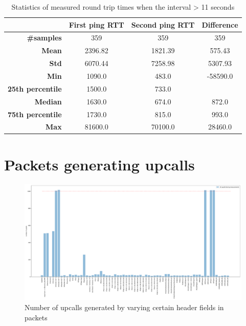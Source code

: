 \begin{table}[h!]
    \begin{center}
        \caption{Statistics of measured round trip times when the interval > 11 seconds}
        \label{tab:upcall-cost}
        \begin{tabular}{r|S[table-format=5.2]S[table-format=5.2]S[table-format=5.2]}
            & \textbf{First ping RTT} & \textbf{Second ping RTT} & \textbf{Difference} \\
            \hline
            \textbf{\#samples} & 359 & 359 & 359 \\
            \textbf{Mean} & 2396.82 & 1821.39 & 575.43\\
            \textbf{Std} & 6070.44 & 7258.98 & 5307.93\\
            \textbf{Min} & 1090.0 & 483.0 & -58590.0\\
            \textbf{25th percentile} & 1500.0 & 733.0 &  \\
            \textbf{Median} & 1630.0 & 674.0 & 872.0 \\
            \textbf{75th percentile} & 1730.0 & 815.0 & 993.0 \\
            \textbf{Max} & 81600.0 & 70100.0 & 28460.0 \\
        \end{tabular}
    \end{center}
\end{table}

\section{Packets generating upcalls}
\label{res:upcall-generators}

\begin{figure}
    \centering
    \includegraphics[width=.9\linewidth]{img/packet_fuzz.pdf}
    \caption{Number of upcalls generated by varying certain header fields in packets}
    \label{fig:plot-packet-fuzz}
\end{figure}

